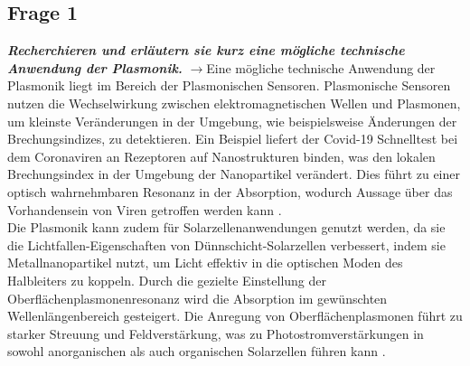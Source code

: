 \subsection{\label{subsec:FZV1}Frage 1}
\textbf{\textit{Recherchieren und erläutern sie kurz eine mögliche technische Anwendung der Plasmonik.}}
$\rightarrow$Eine mögliche technische Anwendung der Plasmonik liegt im Bereich der Plasmonischen Sensoren. 
Plasmonische Sensoren nutzen die Wechselwirkung zwischen elektromagnetischen Wellen und Plasmonen, 
um kleinste Veränderungen in der Umgebung, wie beispielsweise Änderungen der Brechungsindizes, zu detektieren.
Ein Beispiel liefert der Covid-19 Schnelltest bei dem Coronaviren an Rezeptoren auf Nanostrukturen binden, 
was den lokalen Brechungsindex in der Umgebung der Nanopartikel verändert. 
Dies führt zu einer optisch wahrnehmbaren Resonanz in der Absorption, wodurch Aussage über das Vorhandensein
von Viren getroffen werden kann \cite{FZV1p1}. \\ 
Die Plasmonik kann zudem für Solarzellenanwendungen genutzt werden, da sie 
die Lichtfallen-Eigenschaften von Dünnschicht-Solarzellen verbessert, 
indem sie Metallnanopartikel nutzt, um Licht effektiv in die optischen Moden des Halbleiters zu koppeln. 
Durch die gezielte Einstellung der Oberflächenplasmonenresonanz wird die Absorption im gewünschten 
Wellenlängenbereich gesteigert. Die Anregung von Oberflächenplasmonen führt zu starker Streuung 
und Feldverstärkung, was zu Photostromverstärkungen in sowohl anorganischen als auch organischen 
Solarzellen führen kann \cite{FZV1}.
